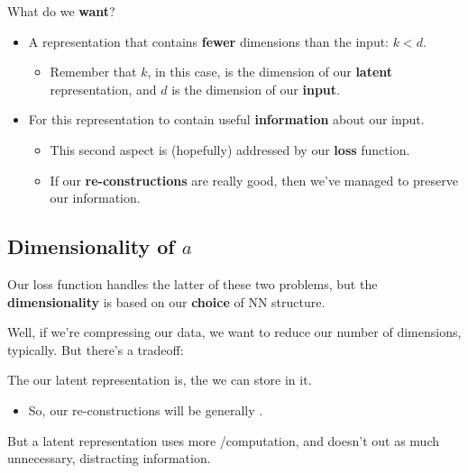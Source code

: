     What do we \textbf{want}?

    \begin{itemize}
        \item A representation that contains \textbf{fewer} dimensions than the input: $k < d$.

            \begin{itemize}
                \item Remember that $k$, in this case, is the dimension of our \textbf{latent} representation, and $d$ is the dimension of our \textbf{input}.
            \end{itemize}

        \item For this representation to contain useful \textbf{information} about our input.
            \begin{itemize}
                \item This second aspect is (hopefully) addressed by our \textbf{loss} function. 
                \item If our \textbf{re-constructions} are really good, then we've managed to preserve our information.
            \end{itemize}
    \end{itemize}

    \subsection{Dimensionality of $a$}

        Our loss function handles the latter of these two problems, but the \textbf{dimensionality} is based on our \textbf{choice} of NN structure.

        Well, if we're compressing our data, we want to reduce our number of dimensions, typically. But there's a tradeoff:\\

        \begin{concept}
            The  our latent representation is, the  we can store in it.

            \begin{itemize}
                \item So, our re-constructions will be generally .
            \end{itemize}

            But a  latent representation uses more /computation, and doesn't  out as much unnecessary, distracting information.
        \end{concept}

